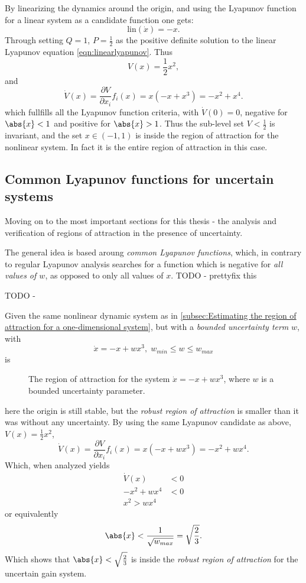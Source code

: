 By linearizing the dynamics around the origin, and using the Lyapunov function
for a linear system as a candidate function one gets:
\[
  \text{lin}(\dot{x}) = -x.
\]
Through setting \(Q=1\), \(P=\frac{1}{2}\) as the positive definite solution to
the linear Lyapunov equation \ref{eqn:linearlyapunov}. Thus
\[
  V(x) = \frac{1}{2}x^2,
\]
and
\[
  \dot{V}(x) = \frac{\partial V}{\partial x_i} f_i(x) = x(-x + x^3) = -x^2 + x^4.
\]
which fullfills all the Lyapunov function criteria, with \(\dot{V}(0) = 0\),
negative for \(\abs{x}<1\) and positive for \(\abs{x} > 1\). Thus the sub-level
set \(V < \frac{1}{2}\) is invariant, and the set \(x \in \left( -1, 1 \right)\)
is inside the region of attraction for the nonlinear system. In fact it is the
entire region of attraction in this case.

\subsection{Common Lyapunov functions for uncertain systems}

Moving on to the most important sections for this thesis - the analysis and
verification of regions of attraction in the presence of uncertainty.

The general idea is based aroung \textit{common Lyapunov functions}, which, in
contrary to regular Lyapunov analysis searches for a function which is negative
for \textit{all values of \(w\)}, as opposed to only all values of \(x\).
TODO - prettyfix this

\begin{definition}
TODO -
\end{definition}

\begin{example}
  Given the same nonlinear dynamic system as in \ref{subsec:Estimating the
    region of attraction for a one-dimensional system}, but with a
  \textit{bounded uncertainty term} \(w\), with 
  \[
    \dot{x} = -x + wx^3, \; w_{min} \leq w \leq w_{max}
  \]
  is 

  \begin{figure}
    
    \caption{The region of attraction for the system \(\dot{x} = -x + wx^3\),
      where \(w\) is a bounded uncertainty parameter.}
  \end{figure}
\end{example}

here the origin is still stable, but the \textit{robust region of attraction} is
smaller than it was without any uncertainty. By using the same Lyapunov
candidate as above, \(V(x) = \frac{1}{2}x^2\),
\[
  \dot{V}(x) = \frac{\partial V}{\partial x_i} f_i(x) = x(-x + wx^3) = -x^2 + wx^4.
\]
Which, when analyzed yields
\begin{align*}
  \dot{V}(x) &< 0 \\
  -x^2 + wx^4 &< 0 \\
  x^2 > wx^4
\end{align*}
or equivalently
\[
  \abs{x} < \frac{1}{\sqrt{w_{max}}} = \sqrt{\frac{2}{3}}.
\]
Which shows that \(\abs{x} < \sqrt{\frac{2}{3}}\) is inside the \textit{robust
  region of attraction} for the uncertain gain system.

